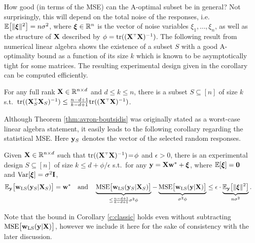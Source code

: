 \documentclass[12pt]{sty/colt2019/colt2018-arxiv}
\begin{document}
How good (in terms of the MSE) can the A-optimal subset be in general?
Not surprisingly, this will depend on the total noise of the responses,
i.e.~$\mathbb E\big[\|\boldsymbol\xi\|^2\big]=n\sigma^2$, where $\boldsymbol\xi\in\mathbb R^n$ is the vector of
noise variables $\xi_1,\dots,\xi_n$, as well as the structure of $\mathbf X$ described
by $\phi=\tr((\X^\top\X)^{-1})$.
The following result from numerical linear algebra %
shows the existence of a subset $S$ with a
good A-optimality bound as a function of its size $k$ 
which is known to be asymptotically tight for some
matrices. The resulting experimental design given in
the corollary can be computed efficiently. 
\begin{theorem}
\label{thm:avron-boutsidis}
For any full rank $\mathbf X\in\mathbb R^{n\times d}$ and $d\leq k\leq n$, there is a
subset $S\subseteq[n]$ of size $k$ s.t.~$\tr((\X_S^\top\X_S)^{-1})\leq
\frac{n-d+1}{k-d+1}\tr((\X^\top\X)^{-1})$. 
\end{theorem}
Although Theorem \ref{thm:avron-boutsidis}
was originally stated as a worst-case linear algebra statement, it
easily leads to the following corollary regarding the statistical MSE.
Here $\mathbf y_S$ denotes the vector of the selected random responses.
\begin{corollary}\label{c:classic}
Given $\mathbf X\in\mathbb R^{n\times d}$ such that 
$\tr((\X^\top\X)^{-1})\!=\!\phi$ and $\epsilon>0$, there is an
experimental design $S\subseteq [n]$
of size $k\leq d+\phi/\epsilon$ s.t.~for any $\mathbf y=\mathbf X\mathbf w^*+\boldsymbol\xi$, where $\mathbb E[\boldsymbol\xi] = \mathbf 0$
and $\mathrm{Var}[\boldsymbol\xi]=\sigma^2\mathbf I$,
\begin{align*}
  \E_\y\big[\wols(\y_S|\X_S)\big]=\w^*\quad\text{and}\quad
  \underbrace{\mathrm{MSE}\big[\wols(\y_S|\X_S)\big]}_{\leq\frac{n-d+1}{k-d+1}\sigma^2\phi} -
    \underbrace{\mathrm{MSE}\big[\wols(\y|\X)\big]}_{\sigma^2\phi} \leq \epsilon\cdot
  \underbrace{\E_\y\big[\|\xib\|^2\big]}_{n\sigma^2}.%
\end{align*}
\end{corollary}
Note that the bound in Corollary \ref{c:classic} holds even without
subtracting ${\mathrm{MSE}\big[\mathbf w_{\mathrm{LS}}(\mathbf y|\mathbf X)\big]}$, however we include it here for the sake of
consistency with the later discussion.
\end{document}
